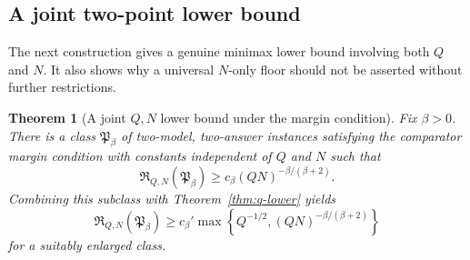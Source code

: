 \documentclass[11pt]{article}
\newtheorem{theorem}{Theorem}
\begin{document}
\subsection{A joint two-point lower bound}

The next construction gives a genuine minimax lower bound involving both $Q$ and $N$.  It also shows why a universal $N$-only floor should not be asserted without further restrictions.

\begin{theorem}[A joint $Q,N$ lower bound under the margin condition]
\label{thm:joint-lower}
Fix $\beta>0$.  There is a class $\mathfrak P_\beta$ of two-model, two-answer instances satisfying the comparator margin condition with constants independent of $Q$ and $N$ such that
\[
\mathfrak R_{Q,N}(\mathfrak P_\beta)
\ge
c_\beta
(QN)^{-\beta/(\beta+2)}.
\]
Combining this subclass with Theorem~\ref{thm:q-lower} yields
\[
\mathfrak R_{Q,N}(\mathfrak P_\beta)
\ge
c_\beta'
\max\left\{
Q^{-1/2},
(QN)^{-\beta/(\beta+2)}
\right\}
\]
for a suitably enlarged class.
\end{theorem}
\end{document}

